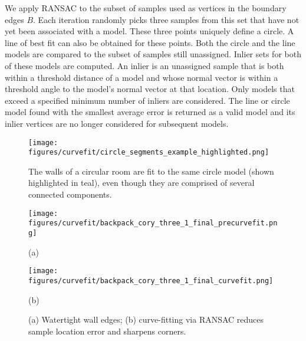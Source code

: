 \documentclass[10pt,twocolumn,letterpaper]{article}
\begin{document}
We apply RANSAC to the subset of samples used as vertices in the boundary edges $B$.  Each iteration randomly picks three samples from this set that have not yet been associated with a model.  These three points uniquely define a circle.  A line of best fit can also be obtained for these points.  Both the circle and the line models are compared to the subset of samples still unassigned.  Inlier sets for both of these models are computed.  An inlier is an unassigned sample that is both within a threshold distance of a model and whose normal vector is within a threshold angle to the model's normal vector at that location.  Only models that exceed a specified minimum number of inliers are considered.  The line or circle model found with the smallest average error is returned as a valid model and its inlier vertices are no longer considered for subsequent models.

\begin{figure}[t]

\begin{minipage}[b]{1.0\linewidth}
  \centering
  \centerline{\texttt{[image: figures/curvefit/circle\_segments\_example\_highlighted.png]}}
\end{minipage}

\caption{The walls of a circular room are fit to the same circle model (shown highlighted in teal), even though they are comprised of several connected components. }
\label{fig:circle_segments_example}

\end{figure}

\begin{figure}[t]

\begin{minipage}[b]{0.45\linewidth}
  \centering
  \centerline{\texttt{[image: figures/curvefit/backpack\_cory\_three\_1\_final\_precurvefit.png]}}
  \centerline{(a)}
\end{minipage}
\hfill
\begin{minipage}[b]{0.45\linewidth}
  \centering
  \centerline{\texttt{[image: figures/curvefit/backpack\_cory\_three\_1\_final\_curvefit.png]}}
  \centerline{(b)}
\end{minipage}

\caption{(a) Watertight wall edges; (b) curve-fitting via RANSAC reduces sample location error and sharpens corners.}
\label{fig:wall_straightening}

\end{figure}
\end{document}
